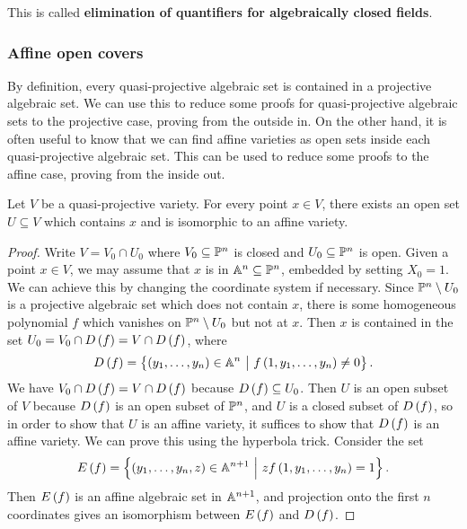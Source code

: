 This is called \textbf{elimination of quantifiers for algebraically closed fields}.

\pagebreak

\subsubsection{Affine open covers}


By definition, every quasi-projective algebraic set is contained in a projective algebraic set. We can use this to reduce some proofs for quasi-projective algebraic sets to the projective case, proving from the outside in. On the other hand, it is often useful to know that we can find affine varieties as open sets inside each quasi-projective algebraic set. This can be used to reduce some proofs to the affine case, proving from the inside out.

\begin{lemma}
\label{lem:quasiprojectiveaffine}
Let $ V $ be a quasi-projective variety. For every point $ x \in V $, there exists an open set $ U \subseteq V $ which contains $ x $ and is isomorphic to an affine variety.
\end{lemma}

\begin{proof}
Write $ V = V_0 \cap U_0 $ where $ V_0 \subseteq \PP^n $ is closed and $ U_0 \subseteq \PP^n $ is open. Given a point $ x \in V $, we may assume that $ x $ is in $ \AA^n \subseteq \PP^n $, embedded by setting $ X_0 = 1 $. We can achieve this by changing the coordinate system if necessary. Since $ \PP^n \setminus U_0 $ is a projective algebraic set which does not contain $ x $, there is some homogeneous polynomial $ f $ which vanishes on $ \PP^n \setminus U_0 $ but not at $ x $. Then $ x $ is contained in the set $ U_0 = V_0 \cap D\br{f} = V \cap D\br{f} $, where
$$ D\br{f} = \cbr{\br{y_1, \dots, y_n} \in \AA^n \st f\br{1, y_1, \dots, y_n} \ne 0}. $$
We have $ V_0 \cap D\br{f} = V \cap D\br{f} $ because $ D\br{f} \subseteq U_0 $. Then $ U $ is an open subset of $ V $ because $ D\br{f} $ is an open subset of $ \PP^n $, and $ U $ is a closed subset of $ D\br{f} $, so in order to show that $ U $ is an affine variety, it suffices to show that $ D\br{f} $ is an affine variety. We can prove this using the hyperbola trick. Consider the set
$$ E\br{f} = \cbr{\br{y_1, \dots, y_n, z} \in \AA^{n + 1} \st zf\br{1, y_1, \dots, y_n} = 1}. $$
Then $ E\br{f} $ is an affine algebraic set in $ \AA^{n + 1} $, and projection onto the first $ n $ coordinates gives an isomorphism between $ E\br{f} $ and $ D\br{f} $.
\end{proof}

